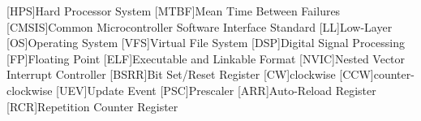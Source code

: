 \begin{acronym}
    [HPS]{Hard Processor System}
    [MTBF]{Mean Time Between Failures}
    [CMSIS]{Common Microcontroller Software Interface Standard}
    [LL]{Low-Layer}
    [OS]{Operating System}
    [VFS]{Virtual File System}
    [DSP]{Digital Signal Processing}
    [FP]{Floating Point}
    [ELF]{Executable and Linkable Format}
    [NVIC]{Nested Vector Interrupt Controller}
    [BSRR]{Bit Set/Reset Register}
    [CW]{clockwise}
    [CCW]{counter-clockwise}
    [UEV]{Update Event}
    [PSC]{Prescaler}
    [ARR]{Auto-Reload Register}
    [RCR]{Repetition Counter Register}
\end{acronym}